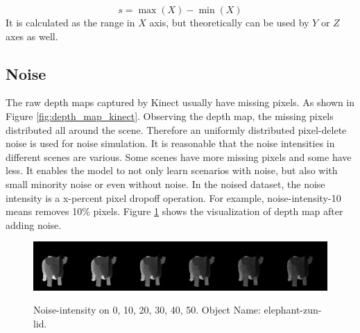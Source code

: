 \begin{dmath*}
	s = \max(X)-\min(X)
\end{dmath*}
It is calculated as the range in $ X $ axis, but theoretically can be used by $ Y $ or $ Z $ axes as well.




\subsection{Noise}
\label{sec:noise}
The raw depth maps captured by Kinect usually have missing pixels. As shown in Figure \ref{fig:depth_map_kinect}.
Observing the depth map, the missing pixels distributed all around the scene. Therefore an uniformly distributed pixel-delete noise is used for noise simulation. 
It is reasonable that the noise intensities in different scenes are various. Some scenes have more missing pixels and some have less. It enables the model to not only learn scenarios with noise, but also with small minority noise or even without noise. In the noised dataset, the noise intensity is a x-percent pixel dropoff operation. For example, noise-intensity-10 means removes 10\% pixels.
Figure \ref{fig:noise-intensity} shows the visualization of depth map after adding noise.
\begin{figure}[!h]
	\centering
	{\includegraphics[width=.9\textwidth]{./Figures/add_noise_depth.png}}
	\decoRule	
	\caption{Noise-intensity on 0, 10, 20, 30, 40, 50. Object Name: elephant-zun-lid.}
	\label{fig:noise-intensity}
\end{figure}



